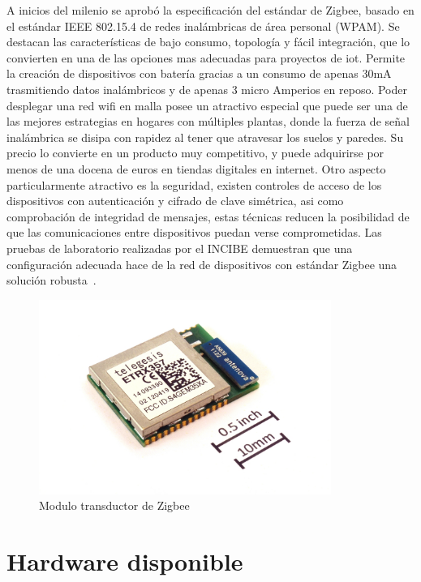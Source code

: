 \vspace{1cm}

 A inicios del milenio se aprobó la especificación del estándar de Zigbee, basado en el estándar IEEE 802.15.4 de redes inalámbricas de área personal (WPAM). Se destacan las características de bajo consumo, topología y fácil integración, que lo convierten en una de las opciones mas adecuadas para proyectos de \gls{iot}. Permite la creación de dispositivos con batería gracias a un consumo de apenas 30mA  trasmitiendo datos inalámbricos y de apenas 3 micro Amperios en reposo. Poder desplegar una red \gls{wifi} en malla posee un atractivo especial que puede ser una de las mejores estrategias en hogares con múltiples plantas, donde la fuerza de señal inalámbrica se disipa con rapidez al tener que atravesar los suelos y paredes. Su precio lo convierte en un producto muy competitivo, y puede adquirirse por menos de una docena de euros en tiendas digitales en internet. Otro aspecto particularmente atractivo es la seguridad, existen controles de acceso de los dispositivos con autenticación y cifrado de clave simétrica, asi como comprobación de integridad de mensajes, estas técnicas reducen la posibilidad de que las comunicaciones entre dispositivos puedan verse comprometidas. Las pruebas de laboratorio realizadas por el INCIBE demuestran que una configuración adecuada hace de la red de dispositivos con estándar Zigbee una solución robusta~\cite{incibe_zigbee}.
 
\begin{figure}[hbt!]
\centering
\includegraphics[height=2.5in]{figures/ETRX357_ZigBee_module_with_size_ref.jpg}
\caption[Modulo transductor de 2.4Gh Zigbee ETRX357]{Modulo transductor de Zigbee\footnotemark}
\end{figure}



\section{Hardware disponible}
\label{ch:Capitulo2.4}

